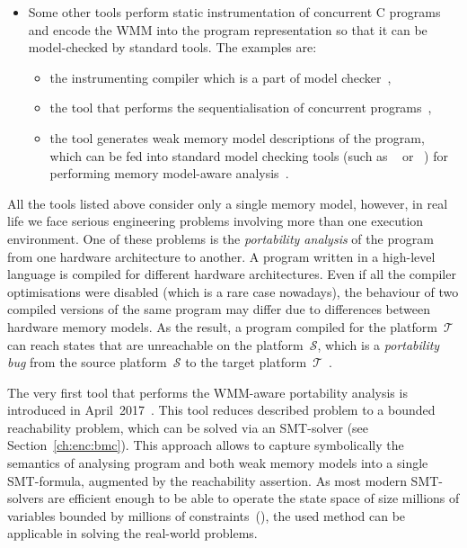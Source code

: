 \begin{itemize}[noitemsep,topsep=0pt,leftmargin=\parindent]
\item Some other tools perform static instrumentation of concurrent C programs and encode the WMM into the program representation so that it can be model-checked by standard tools.
The examples are:
\begin{itemize}[noitemsep,topsep=0pt]
\item the instrumenting compiler  which is a part of  model checker~\cite{kroening2014cbmc},
\item the tool that performs the sequentialisation of concurrent programs~\cite{alglave2013software},
\item the tool  generates weak memory model descriptions of the program, which can be fed into standard model checking tools (such as ~\cite{holzmann1997model} or ~\cite{cimatti2000nusmv}) for performing memory model-aware analysis~\cite{travkin2016verification}.
\end{itemize}

\end{itemize}


All the tools listed above consider only a single memory model, however, in real life we face serious engineering problems involving more than one execution environment.
One of these problems is the \textit{portability analysis} of the program from one hardware architecture to another.
A program written in a high-level language is compiled for different hardware architectures.
Even if all the compiler optimisations were disabled (which is a rare case nowadays), the behaviour of two compiled versions of the same program may differ due to differences between hardware memory models.
As the result, a program compiled for the platform~$\mathcal{T}$ can reach states that are unreachable on the platform~$\mathcal{S}$, which is a \textit{portability bug} from the source platform~$\mathcal{S}$ to the target platform~$\mathcal{T}$~\cite{Porthos17a}.

The very first tool that performs the WMM-aware portability analysis is \porthos{}%
%
%
introduced in April~2017~\cite{Porthos17a}.
This tool reduces described problem to a bounded reachability problem, which can be solved via an SMT-solver (see Section~\ref{ch:enc:bmc}).
This approach allows to capture symbolically the semantics of analysing program and both weak memory models into a single SMT-formula, augmented by the reachability assertion.
As most modern SMT-solvers are efficient enough to be able to operate the state space of size millions of variables bounded by millions of constraints~(\cite{malik2009boolean}), the used method can be applicable in solving the real-world problems.

